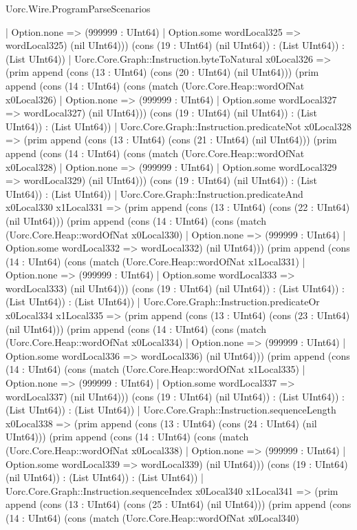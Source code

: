 \begin{lexlean}{Uorc.Wire.ProgramParseScenarios}
\begin{semanticmodule}
{      | Option.none => (999999 : UInt64)
      | Option.some wordLocal325 => wordLocal325) (nil UInt64))) (cons (19 : UInt64) (nil UInt64)) : (List UInt64)) : (List UInt64))
    | Uorc.Core.Graph::Instruction.byteToNatural x0Local326 => (prim append (cons (13 : UInt64) (cons (20 : UInt64) (nil UInt64))) (prim append (cons (14 : UInt64) (cons (match (Uorc.Core.Heap::wordOfNat x0Local326)
      | Option.none => (999999 : UInt64)
      | Option.some wordLocal327 => wordLocal327) (nil UInt64))) (cons (19 : UInt64) (nil UInt64)) : (List UInt64)) : (List UInt64))
    | Uorc.Core.Graph::Instruction.predicateNot x0Local328 => (prim append (cons (13 : UInt64) (cons (21 : UInt64) (nil UInt64))) (prim append (cons (14 : UInt64) (cons (match (Uorc.Core.Heap::wordOfNat x0Local328)
      | Option.none => (999999 : UInt64)
      | Option.some wordLocal329 => wordLocal329) (nil UInt64))) (cons (19 : UInt64) (nil UInt64)) : (List UInt64)) : (List UInt64))
    | Uorc.Core.Graph::Instruction.predicateAnd x0Local330 x1Local331 => (prim append (cons (13 : UInt64) (cons (22 : UInt64) (nil UInt64))) (prim append (cons (14 : UInt64) (cons (match (Uorc.Core.Heap::wordOfNat x0Local330)
      | Option.none => (999999 : UInt64)
      | Option.some wordLocal332 => wordLocal332) (nil UInt64))) (prim append (cons (14 : UInt64) (cons (match (Uorc.Core.Heap::wordOfNat x1Local331)
      | Option.none => (999999 : UInt64)
      | Option.some wordLocal333 => wordLocal333) (nil UInt64))) (cons (19 : UInt64) (nil UInt64)) : (List UInt64)) : (List UInt64)) : (List UInt64))
    | Uorc.Core.Graph::Instruction.predicateOr x0Local334 x1Local335 => (prim append (cons (13 : UInt64) (cons (23 : UInt64) (nil UInt64))) (prim append (cons (14 : UInt64) (cons (match (Uorc.Core.Heap::wordOfNat x0Local334)
      | Option.none => (999999 : UInt64)
      | Option.some wordLocal336 => wordLocal336) (nil UInt64))) (prim append (cons (14 : UInt64) (cons (match (Uorc.Core.Heap::wordOfNat x1Local335)
      | Option.none => (999999 : UInt64)
      | Option.some wordLocal337 => wordLocal337) (nil UInt64))) (cons (19 : UInt64) (nil UInt64)) : (List UInt64)) : (List UInt64)) : (List UInt64))
    | Uorc.Core.Graph::Instruction.sequenceLength x0Local338 => (prim append (cons (13 : UInt64) (cons (24 : UInt64) (nil UInt64))) (prim append (cons (14 : UInt64) (cons (match (Uorc.Core.Heap::wordOfNat x0Local338)
      | Option.none => (999999 : UInt64)
      | Option.some wordLocal339 => wordLocal339) (nil UInt64))) (cons (19 : UInt64) (nil UInt64)) : (List UInt64)) : (List UInt64))
    | Uorc.Core.Graph::Instruction.sequenceIndex x0Local340 x1Local341 => (prim append (cons (13 : UInt64) (cons (25 : UInt64) (nil UInt64))) (prim append (cons (14 : UInt64) (cons (match (Uorc.Core.Heap::wordOfNat x0Local340)
}
\end{semanticmodule}
\end{lexlean}
